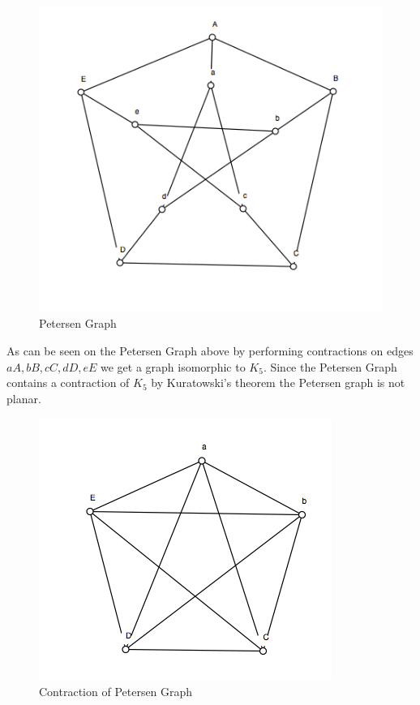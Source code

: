 \begin{figure}
\includegraphics[scale=.5]{petersengraph}
\caption{Petersen Graph}
\end{figure}
As can be seen on the Petersen Graph above
by performing contractions on edges $aA, bB, cC, dD, eE$ we get a graph 
isomorphic to $K_5$. Since the Petersen  Graph contains a contraction of $K_5$ 
by Kuratowski's theorem the Petersen graph is not planar.
\begin{figure}
\includegraphics[scale=.5]{k5}
\caption{Contraction of Petersen Graph}
\end{figure}

